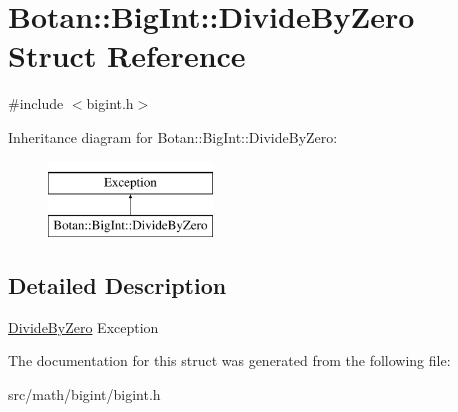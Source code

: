 \hypertarget{structBotan_1_1BigInt_1_1DivideByZero}{\section{Botan\-:\-:Big\-Int\-:\-:Divide\-By\-Zero Struct Reference}
\label{structBotan_1_1BigInt_1_1DivideByZero}
}


{\ttfamily \#include $<$bigint.\-h$>$}

Inheritance diagram for Botan\-:\-:Big\-Int\-:\-:Divide\-By\-Zero\-:\begin{figure}[H]
\begin{center}
\leavevmode
\includegraphics[height=2.000000cm]{structBotan_1_1BigInt_1_1DivideByZero}
\end{center}
\end{figure}


\subsection{Detailed Description}
\hyperlink{structBotan_1_1BigInt_1_1DivideByZero}{Divide\-By\-Zero} Exception 

The documentation for this struct was generated from the following file\-:\begin{DoxyCompactItemize}
\item 
src/math/bigint/bigint.\-h\end{DoxyCompactItemize}
